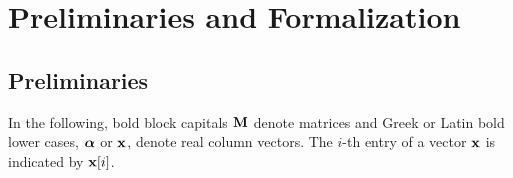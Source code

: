 \section{Preliminaries and Formalization}\label{sec:preliminaries}





\subsection{Preliminaries}
In the following, bold block capitals $\textbf{M}$ denote matrices and Greek or Latin bold lower cases, $\boldsymbol\alpha$ or   $\textbf{x}$, denote real column vectors. The $i$-th entry of a vector $\textbf{x}$ is indicated by $\textbf{x}[i]$.\\

